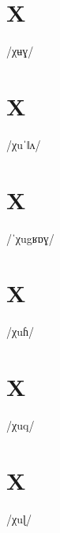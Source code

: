 \documentclass[10pt,a4paper,twoside]{book}
\begin{document}
\section*{X}

\begin{multicols}{3}
 {/χʉɣ/} {}
\end{multicols}

\section*{X}

\begin{multicols}{3}
 {/χuˈǁʌ/} {}
\end{multicols}

\section*{X}

\begin{multicols}{3}
 {/ˈχugʁɒɣ/} {}
\end{multicols}

\section*{X}

\begin{multicols}{3}
 {/χuɦ/} {}
\end{multicols}

\section*{X}

\begin{multicols}{3}
 {/χuq/} {}
\end{multicols}

\section*{X}

\begin{multicols}{3}
 {/χuɭ/} {}
\end{multicols}
\end{document}
